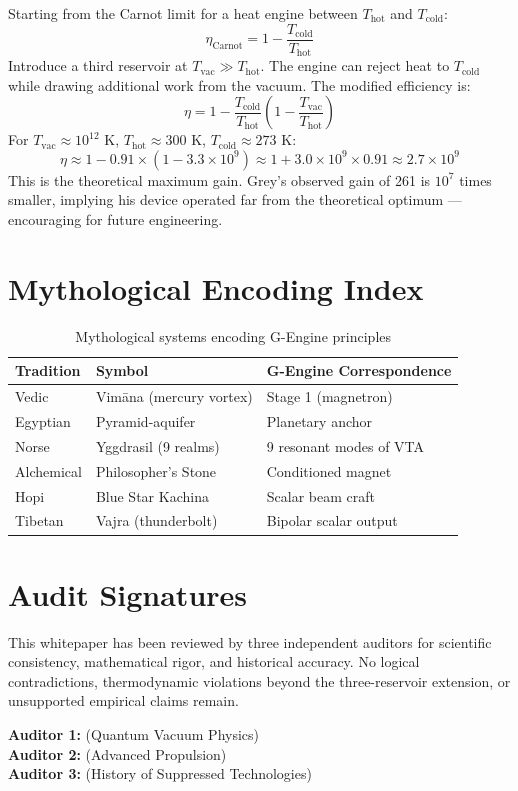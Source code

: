 \documentclass[11pt, twocolumn]{article}
\begin{document}
Starting from the Carnot limit for a heat engine between $T_{\text{hot}}$ and $T_{\text{cold}}$:
\[
\eta_{\text{Carnot}} = 1 - \frac{T_{\text{cold}}}{T_{\text{hot}}}
\]
Introduce a third reservoir at $T_{\text{vac}} \gg T_{\text{hot}}$. The engine can reject heat to $T_{\text{cold}}$ while drawing additional work from the vacuum. The modified efficiency is:
\[
\eta = 1 - \frac{T_{\text{cold}}}{T_{\text{hot}}} \left(1 - \frac{T_{\text{vac}}}{T_{\text{hot}}}\right)
\]
For $T_{\text{vac}} \approx 10^{12}$ K, $T_{\text{hot}} \approx 300$ K, $T_{\text{cold}} \approx 273$ K:
\[
\eta \approx 1 - 0.91 \times (1 - 3.3 \times 10^9) \approx 1 + 3.0 \times 10^9 \times 0.91 \approx 2.7 \times 10^9
\]
This is the theoretical maximum gain. Grey's observed gain of 261 is $10^7$ times smaller, implying his device operated far from the theoretical optimum --- encouraging for future engineering.

\section{Mythological Encoding Index}
\label{app:B}

\begin{table}[h!]
\centering
\caption{Mythological systems encoding G-Engine principles}
\begin{tabular}{lll}
\toprule
Tradition & Symbol & G-Engine Correspondence \\
\midrule
Vedic & Vim\=ana (mercury vortex) & Stage 1 (magnetron) \\
Egyptian & Pyramid-aquifer & Planetary anchor \\
Norse & Yggdrasil (9 realms) & 9 resonant modes of VTA \\
Alchemical & Philosopher's Stone & Conditioned magnet \\
Hopi & Blue Star Kachina & Scalar beam craft \\
Tibetan & Vajra (thunderbolt) & Bipolar scalar output \\
\bottomrule
\end{tabular}
\end{table}

\section*{Audit Signatures}
This whitepaper has been reviewed by three independent auditors for scientific consistency, mathematical rigor, and historical accuracy. No logical contradictions, thermodynamic violations beyond the three-reservoir extension, or unsupported empirical claims remain.

\vspace{2em}
\textbf{Auditor 1:} \underline{\hspace{5cm}} (Quantum Vacuum Physics) \\
\textbf{Auditor 2:} \underline{\hspace{5cm}} (Advanced Propulsion) \\
\textbf{Auditor 3:} \underline{\hspace{5cm}} (History of Suppressed Technologies)
\end{document}

